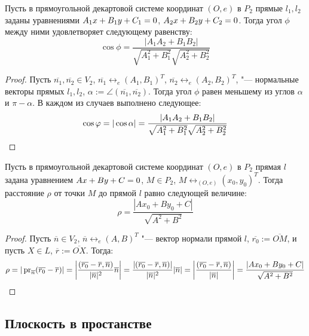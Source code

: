 \begin{proposition}
	Пусть в прямоугольной декартовой системе координат $(O, e)$ в $P_2$ прямые $l_1, l_2$ заданы  уравнениями $A_1x\hm{+}B_1y+C_1=0$, $A_2x\hm{+}B_2y\hm{+}C_2=0$. Тогда угол $\phi$ между ними удовлетворяет следующему равенству:
	\[\cos{\phi} = \frac{|A_1A_2+B_1B_2|}{\sqrt{A_1^2+B_1^2}\sqrt{A_2^2+B_2^2}}\]
\end{proposition}

\begin{proof}
	Пусть $\overline{n_1}, \overline{n_2} \in V_2$, $\overline{n_1} \leftrightarrow_{e} (A_1, B_1)^T$, $\overline{n_2} \leftrightarrow_{e} (A_2, B_2)^T$, "--- нормальные векторы прямых $l_1, l_2$, $\alpha := \angle(\overline{n_1}, \overline{n_2})$. Тогда угол $\phi$ равен меньшему из углов $\alpha$ и $\pi - \alpha$. В каждом из случаев выполнено следующее:
	\[\cos{\phi} = |\cos{\alpha}| = \frac{|A_1A_2+B_1B_2|}{\sqrt{A_1^2+B_1^2}\sqrt{A_2^2+B_2^2}}\qedhere\]
\end{proof}

\begin{proposition}
	Пусть в прямоугольной декартовой системе координат $(O, e)$ в $P_2$ прямая $l$ задана  уравнением $Ax\hm{+}By+C=0$, $M \in P_2$, $M \leftrightarrow_{(O, e)} (x_0, y_0)^T$. Тогда расстояние $\rho$ от точки $M$ до прямой $l$ равно следующей величине:
	\[\rho = \frac{|Ax_0 + By_0 + C|}{\sqrt{A^2 + B^2}}\]
\end{proposition}

\begin{proof}
	Пусть $\overline{n} \in V_2$, $\overline n \leftrightarrow_{e} (A, B)^T$ "--- вектор нормали прямой $l$, $\overline{r_0} := \overline{OM}$, и пусть $X \in L$, $\overline{r} := \overline{OX}$. Тогда:
	\[\rho = |\pr_{\overline{n}}(\overline{r_0} - \overline{r})|
	=
	\left|\frac{(\overline{r_0} - \overline{r}, \overline{n})}{|\overline{n}|^2}\overline{n}\right|
	=
	\frac{|(\overline{r_0} - \overline{r}, \overline{n})|}{|\overline{n}|^2}|\overline{n}|
	=
	\left|\frac{(\overline{r_0} - \overline{r}, \overline{n})}{|\overline{n}|}\right|
	=
	\frac{|Ax_0 + By_0 + C|}{\sqrt{A^2 + B^2}}\qedhere\]
\end{proof}

\subsection{Плоскость в простанстве}


